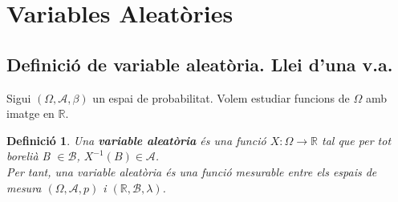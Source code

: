 \documentclass[12pt]{article}
\newcommand{\real}{\mathbb{R}}
\newcommand\inv[1]{#1^{-1}}
\theoremstyle{normal}
\theoremstyle{break}
\newtheorem{defi}[lema]{Definició}
\theoremstyle{breakthm}
\begin{document}
\date{}
\setlength{\parindent}{0pt}
 

\section{Variables Aleatòries}
\subsection{Definició de variable aleatòria. Llei d'una v.a.}
Sigui $(\Omega, \mathcal{A}, \beta)$  un espai de probabilitat. Volem estudiar funcions de $\Omega$ amb imatge en $\real$.

\begin{defi}
  Una \textbf{variable aleatòria} és una funció $X\colon \Omega \to \real$ tal que per tot borelià B 
  $\in \mathcal{B}$, $\inv{X}(B) \in \mathcal{A}$. \\
  
  Per tant, una variable aleatòria és una funció mesurable entre els espais de mesura $(\Omega, \mathcal{A}, p)$ i $(\real, \mathcal{B}, \lambda)$.
\end{defi}
\end{document}
